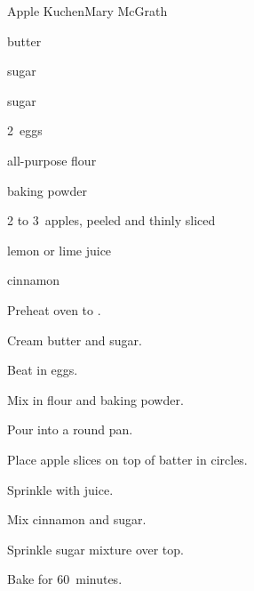 \begin{recipe}{Apple Kuchen\UNTESTED}{Mary McGrath}{}

\begin{ingredients}
\item \C{\half} butter
\item {} sugar
\item {} sugar
\item 2~eggs
\item {} all-purpose flour
\item {} baking powder
\item 2 to 3~apples, peeled and thinly sliced
\item {} lemon or lime juice
\item \tp{\half} cinnamon
\end{ingredients}

\begin{directions}
\item Preheat oven to .
\item Cream butter and  sugar.
\item Beat in eggs.
\item Mix in flour and baking powder.
\item Pour into a  round pan.
\item Place apple slices on top of batter in circles.
\item Sprinkle with juice.
\item Mix cinnamon and  sugar.
\item Sprinkle sugar mixture over top.
\item Bake for 60~minutes.
\end{directions}

\end{recipe}

